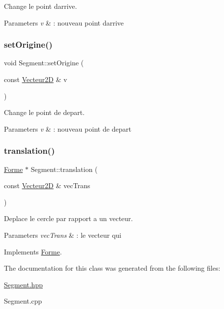 Change le point d\textquotesingle{}arrive. 


\begin{DoxyParams}{Parameters}
{\em v} & \+: nouveau point d\textquotesingle{}arrive \\
\hline
\end{DoxyParams}
\mbox{\label{class_segment_ae22cb982d85cec7a92c7dd1c2c862210}} 
\subsubsection{\texorpdfstring{setOrigine()}{setOrigine()}}
{\footnotesize\ttfamily void Segment\+::set\+Origine (\begin{DoxyParamCaption}\item[{const \mbox{\hyperlink{class_vecteur2_d}{Vecteur2D}} \&}]{v }\end{DoxyParamCaption})\hspace{0.3cm}{\ttfamily [inline]}}



Change le point de depart. 


\begin{DoxyParams}{Parameters}
{\em v} & \+: nouveau point de depart \\
\hline
\end{DoxyParams}
\mbox{\label{class_segment_a0a4ba467ac01d3ece7c5136faf08be1a}} 
\subsubsection{\texorpdfstring{translation()}{translation()}}
{\footnotesize\ttfamily \mbox{\hyperlink{class_forme}{Forme}} $\ast$ Segment\+::translation (\begin{DoxyParamCaption}\item[{const \mbox{\hyperlink{class_vecteur2_d}{Vecteur2D}} \&}]{vec\+Trans }\end{DoxyParamCaption})\hspace{0.3cm}{\ttfamily [virtual]}}



Deplace le cercle par rapport a un vecteur. 


\begin{DoxyParams}{Parameters}
{\em vec\+Trans} & \+: le vecteur qui \\
\hline
\end{DoxyParams}


Implements \mbox{\hyperlink{class_forme}{Forme}}.



The documentation for this class was generated from the following files\+:\begin{DoxyCompactItemize}
\item 
\mbox{\hyperlink{_segment_8hpp}{Segment.\+hpp}}\item 
Segment.\+cpp\end{DoxyCompactItemize}

